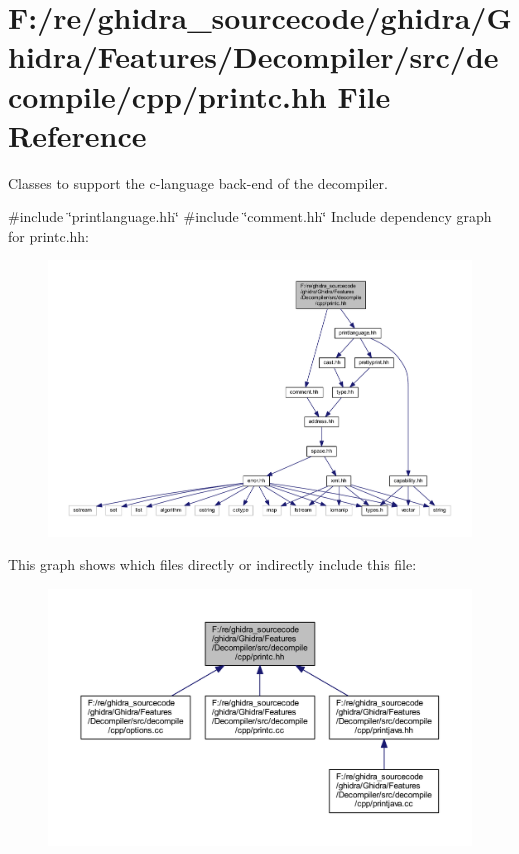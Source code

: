 \hypertarget{printc_8hh}{}\section{F\+:/re/ghidra\+\_\+sourcecode/ghidra/\+Ghidra/\+Features/\+Decompiler/src/decompile/cpp/printc.hh File Reference}
\label{printc_8hh}


Classes to support the c-\/language back-\/end of the decompiler.  


{\ttfamily \#include \char`\"{}printlanguage.\+hh\char`\"{}}\newline
{\ttfamily \#include \char`\"{}comment.\+hh\char`\"{}}\newline
Include dependency graph for printc.\+hh\+:
\nopagebreak
\begin{figure}[H]
\begin{center}
\leavevmode
\includegraphics[width=350pt]{printc_8hh__incl}
\end{center}
\end{figure}
This graph shows which files directly or indirectly include this file\+:
\nopagebreak
\begin{figure}[H]
\begin{center}
\leavevmode
\includegraphics[width=350pt]{printc_8hh__dep__incl}
\end{center}
\end{figure}
